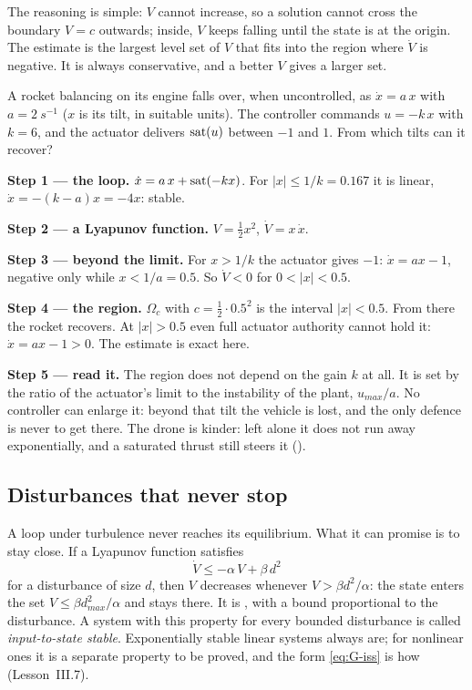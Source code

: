 The reasoning is simple: $V$ cannot increase, so a solution cannot cross the boundary $V = c$ outwards; inside, $V$ keeps falling until the state is at the origin. The estimate is the largest level set of $V$ that fits into the region where $\dot V$ is negative. It is always conservative, and a better $V$ gives a larger set.

\begin{example}
\label{ex:G-roa}
A rocket balancing on its engine falls over, when uncontrolled, as $\dot x = a\,x$ with $a = \SI{2}{s^{-1}}$ ($x$ is its tilt, in suitable units). The controller commands $u = -k\,x$ with $k = 6$, and the actuator delivers $\operatorname{sat}(u)$ between $-1$ and $1$. From which tilts can it recover?

\textbf{Step 1 — the loop.} $\dot x = a\,x + \operatorname{sat}(-kx)$. For $|x| \le 1/k = 0.167$ it is linear, $\dot x = -(k - a)x = -4x$: stable.

\textbf{Step 2 — a Lyapunov function.} $V = \tfrac12x^2$, $\dot V = x\,\dot x$.

\textbf{Step 3 — beyond the limit.} For $x > 1/k$ the actuator gives $-1$: $\dot x = ax - 1$, negative only while $x < 1/a = 0.5$. So $\dot V < 0$ for $0 < |x| < 0.5$.

\textbf{Step 4 — the region.} $\Omega_c$ with $c = \tfrac12 \cdot 0.5^2$ is the interval $|x| < 0.5$. From there the rocket recovers. At $|x| > 0.5$ even full actuator authority cannot hold it: $\dot x = ax - 1 > 0$. The estimate is exact here.

\textbf{Step 5 — read it.} The region does not depend on the gain $k$ at all. It is set by the ratio of the actuator's limit to the instability of the plant, $u_{max}/a$. No controller can enlarge it: beyond that tilt the vehicle is lost, and the only defence is never to get there. The drone is kinder: left alone it does not run away exponentially, and a saturated thrust still steers it ().
\end{example}

\subsection{Disturbances that never stop}
A loop under turbulence never reaches its equilibrium. What it can promise is to stay close. If a Lyapunov function satisfies
\begin{equation}\label{eq:G-iss}
  \dot V \le -\alpha\,V + \beta\,d^2
\end{equation}
for a disturbance of size $d$, then $V$ decreases whenever $V > \beta d^2/\alpha$: the state enters the set $V \le \beta d_{max}^2/\alpha$ and stays there. It is , with a bound proportional to the disturbance. A system with this property for every bounded disturbance is called \emph{input-to-state stable}. Exponentially stable linear systems always are; for nonlinear ones it is a separate property to be proved, and the form \eqref{eq:G-iss} is how (Lesson~III.7).


